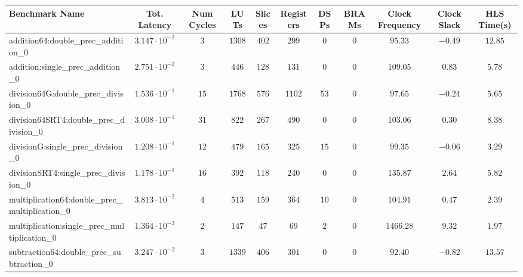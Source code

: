 \begin{tabular}{|l|c|c|c|c|c|c|c|c|c|c|}
\hline
Benchmark Name                                   & Tot. Latency            & Num Cycles & LUTs     & Slices   & Registers & DSPs   & BRAMs & Clock Frequency & Clock Slack & HLS Time(s) \\
\hline
addition64:double\_prec\_addition\_0             & $ 3.147 \cdot 10^{-2} $ & $ 3      $ & $ 1308 $ & $ 402  $ & $ 299   $ & $ 0  $ & $ 0 $ & $ 95.33       $ & $ -0.49   $ & $ 12.85   $ \\
addition:single\_prec\_addition\_0               & $ 2.751 \cdot 10^{-2} $ & $ 3      $ & $ 446  $ & $ 128  $ & $ 131   $ & $ 0  $ & $ 0 $ & $ 109.05      $ & $ 0.83    $ & $ 5.78    $ \\
division64G:double\_prec\_division\_0            & $ 1.536 \cdot 10^{-1} $ & $ 15     $ & $ 1768 $ & $ 576  $ & $ 1102  $ & $ 53 $ & $ 0 $ & $ 97.65       $ & $ -0.24   $ & $ 5.65    $ \\
division64SRT4:double\_prec\_division\_0         & $ 3.008 \cdot 10^{-1} $ & $ 31     $ & $ 822  $ & $ 267  $ & $ 490   $ & $ 0  $ & $ 0 $ & $ 103.06      $ & $ 0.30    $ & $ 8.38    $ \\
divisionG:single\_prec\_division\_0              & $ 1.208 \cdot 10^{-1} $ & $ 12     $ & $ 479  $ & $ 165  $ & $ 325   $ & $ 15 $ & $ 0 $ & $ 99.35       $ & $ -0.06   $ & $ 3.29    $ \\
divisionSRT4:single\_prec\_division\_0           & $ 1.178 \cdot 10^{-1} $ & $ 16     $ & $ 392  $ & $ 118  $ & $ 240   $ & $ 0  $ & $ 0 $ & $ 135.87      $ & $ 2.64    $ & $ 5.82    $ \\
multiplication64:double\_prec\_multiplication\_0 & $ 3.813 \cdot 10^{-2} $ & $ 4      $ & $ 513  $ & $ 159  $ & $ 364   $ & $ 10 $ & $ 0 $ & $ 104.91      $ & $ 0.47    $ & $ 2.39    $ \\
multiplication:single\_prec\_multiplication\_0   & $ 1.364 \cdot 10^{-3} $ & $ 2      $ & $ 147  $ & $ 47   $ & $ 69    $ & $ 2  $ & $ 0 $ & $ 1466.28     $ & $ 9.32    $ & $ 1.97    $ \\
subtraction64:double\_prec\_subtraction\_0       & $ 3.247 \cdot 10^{-2} $ & $ 3      $ & $ 1339 $ & $ 406  $ & $ 301   $ & $ 0  $ & $ 0 $ & $ 92.40       $ & $ -0.82   $ & $ 13.57   $ \\

\end{tabular}
